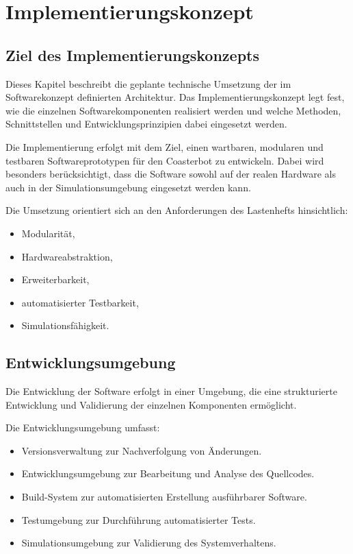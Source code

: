 \section{Implementierungskonzept}\label{implementierungskonzept}

\subsection{Ziel des
Implementierungskonzepts}\label{ziel-des-implementierungskonzepts}

Dieses Kapitel beschreibt die geplante technische Umsetzung der im
Softwarekonzept definierten Architektur. Das Implementierungskonzept
legt fest, wie die einzelnen Softwarekomponenten realisiert werden und
welche Methoden, Schnittstellen und Entwicklungsprinzipien dabei
eingesetzt werden.

Die Implementierung erfolgt mit dem Ziel, einen wartbaren, modularen und
testbaren Softwareprototypen für den Coasterbot zu entwickeln. Dabei
wird besonders berücksichtigt, dass die Software sowohl auf der realen
Hardware als auch in der Simulationsumgebung eingesetzt werden kann.

Die Umsetzung orientiert sich an den Anforderungen des Lastenhefts
hinsichtlich:

\begin{itemize}
\tightlist
\item
  Modularität,
\item
  Hardwareabstraktion,
\item
  Erweiterbarkeit,
\item
  automatisierter Testbarkeit,
\item
  Simulationsfähigkeit.
\end{itemize}

\subsection{Entwicklungsumgebung}\label{entwicklungsumgebung}

Die Entwicklung der Software erfolgt in einer Umgebung, die eine
strukturierte Entwicklung und Validierung der einzelnen Komponenten
ermöglicht.

Die Entwicklungsumgebung umfasst:

\begin{itemize}
\tightlist
\item
  Versionsverwaltung zur Nachverfolgung von Änderungen.
\item
  Entwicklungsumgebung zur Bearbeitung und Analyse des Quellcodes.
\item
  Build-System zur automatisierten Erstellung ausführbarer Software.
\item
  Testumgebung zur Durchführung automatisierter Tests.
\item
  Simulationsumgebung zur Validierung des Systemverhaltens.
\end{itemize}


